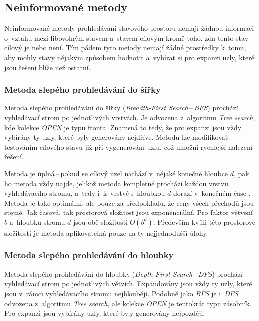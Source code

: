 \subsection*{Neinformované metody}

Neinformované metody prohledávání stavového prostoru nemají žádnou informaci o~vztahu mezi libovolným stavem a~stavem cílovým kromě toho, zda tento stav cílový je nebo není. Tím pádem tyto metody nemají žádné prostředky k~tomu, aby mohly stavy nějakým způsobem hodnotit a~vybírat si pro expanzi uzly, které jsou řešení blíže než ostatní.

\subsubsection*{Metoda slepého prohledávání do šířky}

Metoda slepého prohledávání do šířky (\emph{Breadth-First Search}\,--\,\emph{BFS}) \cite{AI_Russel_Norvig} prochází vyhledávací strom po jednotlivých vrstvách. Je odvozena z~algoritmu \emph{Tree search}, kde kolekce \emph{OPEN} je typu fronta. Znamená to tedy, že pro expanzi jsou vždy vybírány ty uzly, které byly generovány nejdříve. Metodu lze modifikovat testováním cílového stavu již při vygenerování uzlu, což umožní rychlejší nalezení řešení.

Metoda je úplná\,--\,pokud se cílový uzel nachází v~nějaké konečné hloubce $d$, pak ho metoda vždy najde, jelikož metoda kompletně prochází každou vrstvu vyhledávacího stromu, a~tedy i~k~vrstvě s~hloubkou $d$ dorazí v~konečném čase \cite{AI_Ertel}. Metoda je také optimální, ale pouze za předpokladu, že ceny všech přechodů jsou stejné. Jak časová, tak prostorová složitost jsou exponenciální. Pro faktor větvení $b$ a~hloubku stromu $d$ jsou obě složitosti $O(b^d)$. Především kvůli této prostorové složitosti je metoda aplikovatelná pouze na ty nejjednodušší úlohy.

\subsubsection*{Metoda slepého prohledávání do hloubky}

Metoda slepého prohledávání do hloubky (\emph{Depth-First Search}\,--\,\emph{DFS}) \cite{AI_Russel_Norvig} prochází vyhledávací strom po jednotlivých větvích. Expandovány jsou vždy ty uzly, které jsou v~rámci vyhledávacího stromu nejhlouběji. Podobně jako \emph{BFS} je i~\emph{DFS} odvozena z~algoritmu \emph{Tree search}, ale kolekce \emph{OPEN} je tentokrát typu zásobník. Pro expanzi jsou vybírány uzly, které byly generovány nejpozději.


